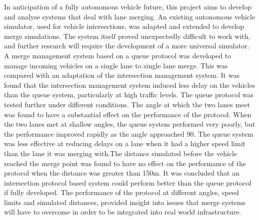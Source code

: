 In anticipation of a fully autonomous vehicle future, this project aims to develop and analyse systems that deal with lane merging. An existing autonomous vehicle simulator, used for vehicle intersections, was adapted and extended to develop merge simulations. The system itself proved unexpectedly difficult to work with, and further research will require the development of a more universal simulator. A merge management system based on a queue protocol was developed to manage incoming vehicles on a single lane to single lane merge. This was compared with an adaptation of the intersection management system. It was found that the intersection management system induced less delay on the vehicles than the queue system, particularly at high traffic levels. The queue protocol was tested further under different conditions. The angle at which the two lanes meet was found to have a substantial effect on the performance of the protocol. When the two lanes met at shallow angles, the queue system performed very poorly, but the performance improved rapidly as the angle approached 90\degree. The queue system was less effective at reducing delays on a lane when it had a higher speed limit than the lane it was merging with.The distance simulated before the vehicle reached the merge point was found to have no effect on the performance of the protocol when the distance was greater than 150\si{m}. It was concluded that an intersection protocol based system could perform better than the queue protocol if fully developed. The performance of the protocol at different angles, speed limits and simulated distances, provided insight into issues that merge systems will have to overcome in order to be integrated into real world infrastructure.